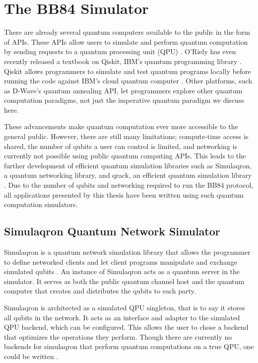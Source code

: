 \chapter{The BB84 Simulator}
\label{chap:implementation}
There are already several quantum computers available to the public in the form of APIs.
These APIs allow users to simulate and perform quantum computation by sending requests to a quantum processing unit (QPU) \cite{qiskit}. 
O'Riely has even recently released a textbook on Qiskit, IBM's quantum programming library \cite{pqc}.
Qiskit allows programmers to simulate and test quantum programs locally before running the code against IBM's cloud quantum computer \cite{qiskit}. 
Other platforms, such as D-Wave's quantum annealing API, let programmers explore other quantum computation paradigms, not just the imperative quantum paradigm we discuss here. 

These advancements make quantum computation ever more accessible to the general public.
However, there are still many limitations; compute-time access is shared, the number of qubits a user can control is limited, and networking is currently not possible using public quantum computing APIs.
This leads to the further development of efficient quantum simulation libraries such as Simulaqron, a quantum networking library, and qrack, an efficient quantum simulation library \cite{qrack}.
Due to the number of qubits and networking required to run the BB84 protocol, all applications presented by this thesis have been written using such quantum computation simulators. 


\section{Simulaqron Quantum Network Simulator}
Simulaqron is a quantum network simulation library that allows the programmer to define networked clients and let client programs manipulate and exchange simulated qubits \cite{simulaqron}.
An instance of Simulaqron acts as a quantum server in the simulator.
It serves as both the public quantum channel host and the quantum computer that creates and distributes the qubits to each party.

Simulaqron is architected as a simulated QPU singleton, that is to say it stores all qubits in the network.
It acts as an interface and adapter to the simulated QPU backend, which can be configured.
This allows the user to chose a backend that optimizes the operations they perform.
Though there are currently no backends for simulaqron that perform quantum computations on a true QPU, one could be written \cite{simulaqron}.

